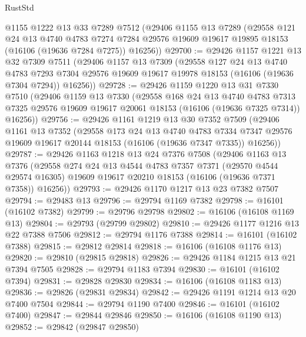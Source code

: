 \begin{lexlean}{RustStd}
\begin{coremodule}
    @1155
    @1222
    @13
    @33
    @7289
    @7512
    (@29406
      @1155
      @13
      @7289
      (@29558
        @121
        @24
        @13
        @4740
        @4783
        @7274
        @7284
        @29576
        @19609
        @19617
        @19895
        @18153
        (@16106 (@19636 @7284 @7275))
        @16256))
@29700 := @29426
    @1157
    @1221
    @13
    @32
    @7309
    @7511
    (@29406
      @1157
      @13
      @7309
      (@29558
        @127
        @24
        @13
        @4740
        @4783
        @7293
        @7304
        @29576
        @19609
        @19617
        @19978
        @18153
        (@16106 (@19636 @7304 @7294))
        @16256))
@29728 := @29426
    @1159
    @1220
    @13
    @31
    @7330
    @7510
    (@29406
      @1159
      @13
      @7330
      (@29558
        @168
        @24
        @13
        @4740
        @4783
        @7313
        @7325
        @29576
        @19609
        @19617
        @20061
        @18153
        (@16106 (@19636 @7325 @7314))
        @16256))
@29756 := @29426
    @1161
    @1219
    @13
    @30
    @7352
    @7509
    (@29406
      @1161
      @13
      @7352
      (@29558
        @173
        @24
        @13
        @4740
        @4783
        @7334
        @7347
        @29576
        @19609
        @19617
        @20144
        @18153
        (@16106 (@19636 @7347 @7335))
        @16256))
@29787 := @29426
    @1163
    @1218
    @13
    @24
    @7376
    @7508
    (@29406
      @1163
      @13
      @7376
      (@29558
        @274
        @24
        @13
        @4544
        @4783
        @7357
        @7371
        (@29570 @4544 @29574 @16305)
        @19609
        @19617
        @20210
        @18153
        (@16106 (@19636 @7371 @7358))
        @16256))
@29793 := @29426 @1170 @1217 @13 @23 @7382 @7507
@29794 := @29483 @13
@29796 := @29794 @1169 @7382
@29798 := @16101 (@16102 @7382)
@29799 := @29796 @29798
@29802 := @16106 (@16108 @1169 @13)
@29804 := @29793 (@29799 @29802)
@29810 := @29426 @1177 @1216 @13 @22 @7388 @7506
@29812 := @29794 @1176 @7388
@29814 := @16101 (@16102 @7388)
@29815 := @29812 @29814
@29818 := @16106 (@16108 @1176 @13)
@29820 := @29810 (@29815 @29818)
@29826 := @29426 @1184 @1215 @13 @21 @7394 @7505
@29828 := @29794 @1183 @7394
@29830 := @16101 (@16102 @7394)
@29831 := @29828 @29830
@29834 := @16106 (@16108 @1183 @13)
@29836 := @29826 (@29831 @29834)
@29842 := @29426 @1191 @1214 @13 @20 @7400 @7504
@29844 := @29794 @1190 @7400
@29846 := @16101 (@16102 @7400)
@29847 := @29844 @29846
@29850 := @16106 (@16108 @1190 @13)
@29852 := @29842 (@29847 @29850)

\end{coremodule}
\end{lexlean}
